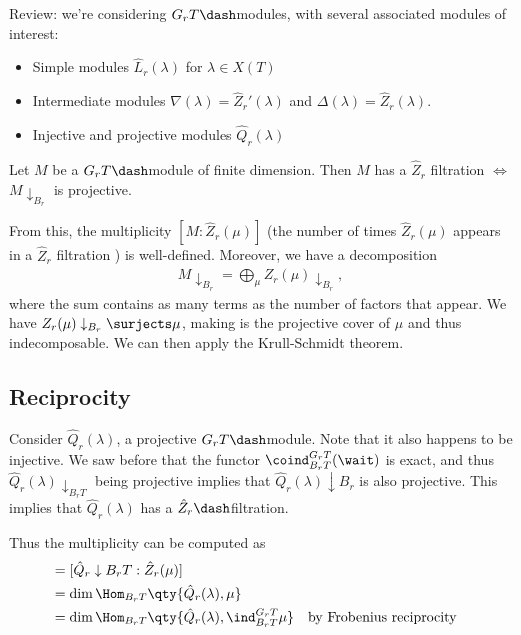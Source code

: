 Review: we're considering \(G_r T\dash\)modules, with several associated
modules of interest:

\begin{itemize}
\tightlist
\item
  Simple modules \(\hat{L}_r(\lambda)\) for \(\lambda \in X(T)\)
\item
  Intermediate modules \(\nabla(\lambda) = \hat{Z}_r'(\lambda)\) and
  \(\Delta(\lambda) = \hat{Z}_r(\lambda)\).
\item
  Injective and projective modules \(\hat{Q}_r(\lambda)\)
\end{itemize}

\begin{theorem}[?]

Let \(M\) be a \(G_r T\dash\)module of finite dimension. Then \(M\) has
a \(\hat{Z}_r\) filtration \(\iff\) \(M\downarrow_{B_r}\) is projective.

\end{theorem}

\begin{remark}

From this, the multiplicity \([M: \hat{Z}_r(\mu)]\) (the number of times
\(\hat{Z}_r(\mu)\) appears in a \(\hat{Z}_r\) filtration ) is
well-defined. Moreover, we have a decomposition
\begin{align*}  
M\downarrow_{B_r} = \bigoplus_{\mu} Z_r(\mu)\downarrow_{B_r}
,\end{align*} where the sum contains as many terms as the number of
factors that appear. We have \(Z_r(\mu)\downarrow_{B_r} \surjects \mu\),
making is the projective cover of \(\mu\) and thus indecomposable. We
can then apply the Krull-Schmidt theorem.

\end{remark}

\hypertarget{reciprocity}{%
\subsection{Reciprocity}\label{reciprocity}}

Consider \(\hat{Q}_r(\lambda)\), a projective \(G_r T\dash\)module. Note
that it also happens to be injective. We saw before that the functor
\(\coind_{B_r T}^{G_r T}(\wait)\) is exact, and thus
\(\hat{Q}_r(\lambda)\downarrow_{B_r T}\) being projective implies that
\(\hat{Q}_r(\lambda)\downarrow{B_r}\) is also projective. This implies
that \(\hat{Q}_r(\lambda)\) has a \(\hat{Z}_r\dash\)filtration.

Thus the multiplicity can be computed as
\begin{align*}
[\hat{Q}_r(\lambda) : \hat{Z}_r(\mu)] 
&= [\hat{Q}_r \downarrow{B_r T} : \hat{Z}_r(\mu)] \\
&= \dim \Hom_{B_r T}\qty{\hat{Q}_r(\lambda), \mu } \\
&= \dim \Hom_{B_r T}\qty{ \hat{Q}_r(\lambda), \ind_{B_r T}^{G_r T} \mu } && \text{by Frobenius reciprocity} \\
\end{align*}

